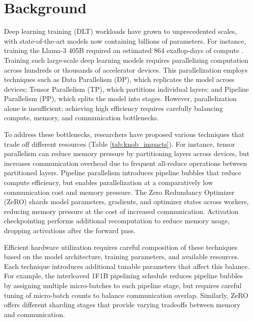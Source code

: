 


\section{Background}
\label{sec:background}

Deep learning training (DLT) workloads have grown to unprecedented scales, with state-of-the-art models now containing billions of parameters. For instance, training the Llama-3 405B required an estimated 864 exaflop-days of compute \cite{dubey2024llama}. Training such large-scale deep learning models requires parallelizing computation across hundreds or thousands of accelerator devices. This parallelization employs techniques such as Data Parallelism (DP), which replicates the model across devices; Tensor Parallelism (TP), which partitions individual layers; and Pipeline Parallelism (PP), which splits the model into stages. However, parallelization alone is insufficient; achieving high efficiency requires carefully balancing compute, memory, and communication bottlenecks.

 To address these bottlenecks, researchers have proposed various techniques that trade off different resources (Table \ref{tab:knob_impacts}). For instance, tensor parallelism can reduce memory pressure by partitioning layers across devices, but increases communication overhead due to frequent all-reduce operations between partitioned layers. Pipeline parallelism \cite{gpipe,pipedream} introduces pipeline bubbles that reduce compute efficiency, but enables parallelization at a comparatively low communication cost and memory pressure. The Zero Redundancy Optimizer (ZeRO) \cite{zero} shards model parameters, gradients, and optimizer states across workers, reducing memory pressure at the cost of increased communication. Activation checkpointing \cite{shah2020memory} performs additional recomputation to reduce memory usage, dropping activations after the forward pass.

Efficient hardware utilization requires careful composition of these techniques based on the model architecture, training parameters, and available resources. Each technique introduces additional tunable parameters that affect this balance. For example, the interleaved 1F1B pipelining schedule \cite{pipedream} reduces pipeline bubbles by assigning multiple micro-batches to each pipeline stage, but requires careful tuning of micro-batch counts to balance communication overlap. Similarly, ZeRO offers different sharding stages that provide varying tradeoffs between memory and communication.

